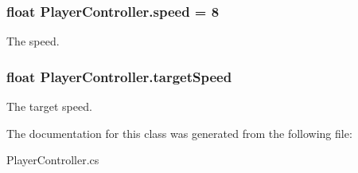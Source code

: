 \hypertarget{classPlayerController_a0928605583f0563cd84fe43119d336ec}{
\subsubsection[{speed}]{\setlength{\rightskip}{0pt plus 5cm}float Player\-Controller.\-speed = 8}}\label{classPlayerController_a0928605583f0563cd84fe43119d336ec}


The speed. 

\hypertarget{classPlayerController_a40ea46cad3dd02224b1b5d05bb530dcc}{
\subsubsection[{target\-Speed}]{\setlength{\rightskip}{0pt plus 5cm}float Player\-Controller.\-target\-Speed}}\label{classPlayerController_a40ea46cad3dd02224b1b5d05bb530dcc}


The target speed. 



The documentation for this class was generated from the following file\-:\begin{DoxyCompactItemize}
\item 
Player\-Controller.\-cs\end{DoxyCompactItemize}
